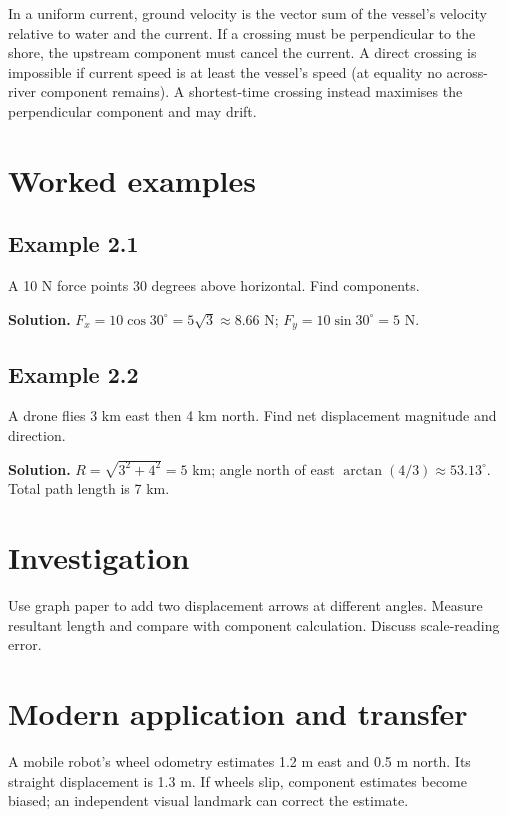 \documentclass[11pt,a4paper,openany]{book}
\begin{document}
In a uniform current, ground velocity is the vector sum of the vessel's velocity relative to water and the current. If a crossing must be perpendicular to the shore, the upstream component must cancel the current. A direct crossing is impossible if current speed is at least the vessel's speed (at equality no across-river component remains). A shortest-time crossing instead maximises the perpendicular component and may drift.
\begin{center}
\end{center}
\section{Worked examples}
\subsection*{Example 2.1}
A 10 N force points 30 degrees above horizontal. Find components.

\textbf{Solution.} $F_x=10\cos30^\circ=5\sqrt3\approx8.66$ N; $F_y=10\sin30^\circ=5$ N.
\subsection*{Example 2.2}
A drone flies 3 km east then 4 km north. Find net displacement magnitude and direction.

\textbf{Solution.} $R=\sqrt{3^2+4^2}=5$ km; angle north of east $\arctan(4/3)\approx53.13^\circ$. Total path length is 7 km.
\section{Investigation}
Use graph paper to add two displacement arrows at different angles. Measure resultant length and compare with component calculation. Discuss scale-reading error.
\section{Modern application and transfer}
A mobile robot's wheel odometry estimates 1.2 m east and 0.5 m north. Its straight displacement is 1.3 m. If wheels slip, component estimates become biased; an independent visual landmark can correct the estimate.
\end{document}
